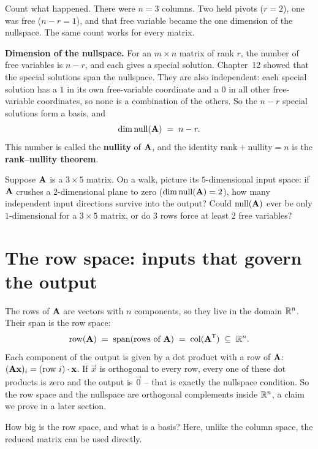 Count what happened. There were $n=3$ columns. Two held pivots ($r=2$), one
was free ($n-r=1$), and that free variable became the one dimension of the nullspace. The same
count works for every matrix.

\begin{formalbox}
\textbf{Dimension of the nullspace.} For an $m\times n$ matrix of rank $r$, the number of free
variables is $n-r$, and each gives a special solution. Chapter~12 showed that the special
solutions span the nullspace. They are also independent: each special solution has a $1$ in its
own free-variable coordinate and a $0$ in all other free-variable coordinates, so none is a
combination of the others. So the $n-r$ special solutions form a basis, and
\[
  \operatorname{dim} \operatorname{null}(\mathbf{A}) \;=\; n - r.
\]
This number is called the \textbf{nullity} of $\mathbf{A}$, and the identity
$\text{rank} + \text{nullity} = n$ is the \textbf{rank--nullity theorem}.
\end{formalbox}

\begin{walkbox}
Suppose $\mathbf{A}$ is a $3\times 5$ matrix. On a walk, picture its $5$-dimensional input
space: if $\mathbf{A}$ crushes a $2$-dimensional plane to zero ($\operatorname{dim}\operatorname{null}(\mathbf{A})=2$),
how many independent input directions survive into the output? Could $\operatorname{null}(\mathbf{A})$
ever be only $1$-dimensional for a $3\times 5$ matrix, or do $3$ rows force at least $2$
free variables?
\end{walkbox}

\section{The row space: inputs that govern the output}

The rows of $\mathbf{A}$ are vectors with $n$ components, so they live in the domain
$\mathbb{R}^n$. Their span is the row space:
\[
  \operatorname{row}(\mathbf{A}) \;=\; \operatorname{span}(\text{rows of }\mathbf{A}) \;=\; \operatorname{col}(\mathbf{A}^{\mathsf{T}}) \;\subseteq\; \mathbb{R}^n.
\]
Each component of the output is given by a dot product with a row of $\mathbf{A}$:
$(\mathbf{A}\mathbf{x})_i = (\text{row }i)\cdot \mathbf{x}$. If $\vec{x}$ is orthogonal to
every row, every one of these dot products is zero and the output is $\vec{0}$ --
that is exactly the nullspace condition. So the row space and the nullspace are orthogonal
complements inside $\mathbb{R}^n$, a claim we prove in a later section.

How big is the row space, and what is a basis? Here, unlike the column space, the reduced
matrix can be used directly.

